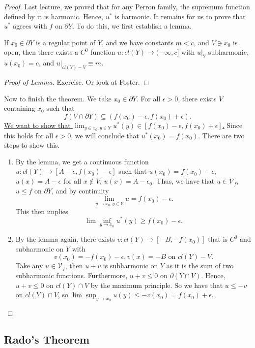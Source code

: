\documentclass{article}
\begin{document}
{\begin{proof}
    Last lecture, we proved that for any Perron family, the supremum function defined by it is harmonic. Hence, $u^*$ is harmonic. It remains for us to prove that $u^*$ agrees with $f$ on $\partial Y$. To do this, we first establish a lemma.
    \begin{lemma}
        If $x_0 \in \partial Y$ is a regular point of $Y$, and we have constants $m < c$, and $V \ni x_0$ is open, then there exists a $C^0$ function $u: cl(Y) \to (-\infty, c]$ with $u|_Y$ subharmonic, $u(x_0) = c$, and $u|_{cl(Y) - V} \equiv m$.
    \end{lemma}

    \begin{proof}[Proof of Lemma]
        Exercise. Or look at Foster.
    \end{proof}

    Now to finish the theorem. We take $x_0 \in \partial Y$. For all $\epsilon > 0$, there exists $V$ containing $x_0$ such that
    \[f(V \cap \partial Y) \subseteq (f(x_0) - \epsilon, f(x_0) + \epsilon).\]
    \underline{We want to show that $\lim_{y \in x_0, y \in Y} u^*(y) \in [f(x_0) - \epsilon, f(x_0) + \epsilon]$.} Since this holds for all $\epsilon > 0$, we will conclude that $u^*(x_0) = f(x_0)$. There are two steps to show this.
    \begin{enumerate}
        \item By the lemma, we get a continuous function $u: cl(Y) \to [A - \epsilon, f(x_0) - \epsilon]$ such that $u(x_0) = f(x_0) - \epsilon$, $u(x) = A - \epsilon$ for all $x \notin V$, $u(x) = A - \epsilon_0$. Thus, we have that $u \in \mathcal{V}_f$, $u \leq f$ on $\partial Y$, and by continuity
        \[\lim_{y \to x_0, y \in Y} u = f(x_0) - \epsilon. \]
        This then implies 
        \[\lim \inf_{y \to x_0} u^*(y) \geq f(x_0) - \epsilon. \]
        \item By the lemma again, there exists $v: cl(Y) \to [-B, -f(x_0)]$ that is $C^0$ and subharmonic on $Y$ with
        \[v(x_0) = -f(x_0) - \epsilon, v(x) = -B \text{ on } cl(Y) - V.\]
        Take any $u \in \mathcal{V}_f$, then $u+v$ is subharmonic on $Y$ as it is the sum of two subharmonic functions. Furthermore, $u + v \leq 0$ on $\partial (Y \cap V)$. Hence, $u + v \leq 0$ on $cl(Y) \cap V$ by the maximum principle. So we have that $u \leq -v$ on $cl(Y) \cap V$, so $\lim \sup_{y \to x_0} u(y) \leq - v(x_0) = f(x_0) + \epsilon$.
    \end{enumerate}
\end{proof}

\subsection{Rado's Theorem}

}
\end{document}
